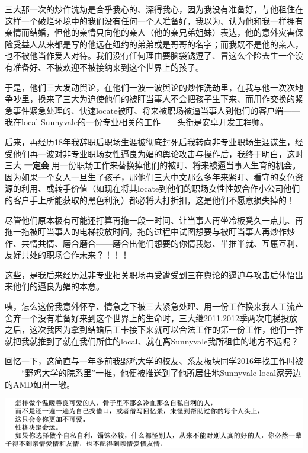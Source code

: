 \documentclass[9pt, b5paper]{article}
\begin{document}
三大那一次的炒作洗劫是合乎我心的、深得我心，因为我没有准备好，与他租住在这样一个破烂环境中的我们没有任何一个人准备好，我以为、认为他和我一样拥有亲情而结婚，但他的亲情只向他的亲人（他的亲兄弟姐妹）表达，他的意外灾害保险受益人从来都是写的他远在纽约的弟弟或是哥哥的名字；而我既不是他的亲人，也不被他当作爱人对待。我们没有任何理由要脑袋锈逗了、冒这么个险去生一个没有准备好、不被欢迎不被接纳来到这个世界上的孩子。 

于是，他们三大发动舆论，在他们一波一波舆论的炒作洗劫里，在我与他一次次地争吵里，换来了三大为迫使他们的被盯当事人不会把孩子生下来、而用作交换的紧急事件紧急处理的、快速locate被盯、将来被职场被逼当事人到他们的客户端——我在local Sunnyvale的一份专业相关的工作——头衔是安卓开发工程师。

后来，再经历18年我辞职后职场生涯被彻底封死后我转向非专业职场生涯谋生，经受他们再一波对非专业职场女性逼良为娼的舆论攻击与操作后，我终于明白，这时三大 \textbf{一定会} 用一份职场工作来替换掉他们的被盯、将来被逼当事人生育的机会。因为如果一个女人一旦生了孩子，那他们三大中文那么多年来紧盯、看守的女色资源的利用、或转手价值（如现在将其locate到他们的职场女性性奴合作小公司他们的客户手上所能获取的黑色利润）都必将大打折扣，这是他们不愿意损失掉的！

尽管他们原本极有可能还打算再拖一段一时间、让当事人再坐冷板凳久一点儿、再拖一拖被盯当事人的电梯投放时间，拖的过程中试图想要与被盯当事人再炒作炒作、共情共情、磨合磨合——磨合出他们想要的你情我愿、半推半就、互惠互利、友好共处的职场合作未来？！！！

这些，是我后来经历过非专业相关职场再受遭受到三在舆论的逼迫与攻击后体悟出来他们的逼良为娼的本意。 

咦，怎么这份我意外怀孕、情急之下被三大紧急处理、用一份工作换来我人工流产舍弃一个没有准备好来到这个世界上的生命时，三大继2011.2012季两次电梯投放之后，这次我因为拿到结婚后工卡接下来就可以合法工作的第一份工作，他们一推就把我就推到了就在我们所住的local、就在离Sunnyvale我所租住的地方不远呢？

回忆一下，这简直与一年多前我野鸡大学的校友、系友板块同学2016年找工作时被——“野鸡大学的院系里”一推，他便被推送到了他所居住地Sunnyvale local家旁边的AMD如出一辙。

\begin{center}
\includegraphics[width=.9\linewidth]{./pic/backups_plans_20210413_131623.png}
\end{center}
\end{document}
